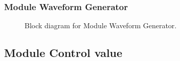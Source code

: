 \subsubsection{Module Waveform Generator}
\begin{figure}[H]
	\centering
	\caption{Block diagram for Module Waveform Generator.}
\end{figure}

\subsection{Module Control value}


